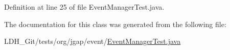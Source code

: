 Definition at line 25 of file Event\-Manager\-Test.\-java.



The documentation for this class was generated from the following file\-:\begin{DoxyCompactItemize}
\item 
L\-D\-H\-\_\-\-Git/tests/org/jgap/event/\hyperlink{_event_manager_test_8java}{Event\-Manager\-Test.\-java}\end{DoxyCompactItemize}
